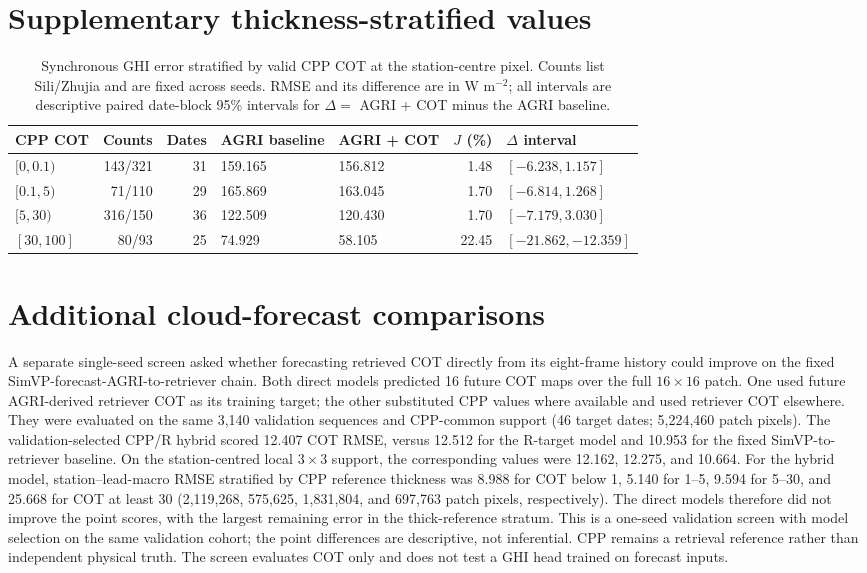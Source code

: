 \documentclass[11pt]{article}
\begin{document}
\FloatBarrier
\clearpage
\appendix
\section{Supplementary thickness-stratified values}
\renewcommand{\thetable}{S\arabic{table}}
\setcounter{table}{0}
\begin{table}[!ht]
\centering\small
\caption{Synchronous GHI error stratified by valid CPP COT at the station-centre pixel. Counts list Sili/Zhujia and are fixed across seeds. RMSE and its difference are in W m$^{-2}$; all intervals are descriptive paired date-block 95\% intervals for $\Delta=$ AGRI + COT minus the AGRI baseline.}
\label{tab:thickness}
\setlength{\tabcolsep}{4pt}
\begin{tabularx}{\linewidth}{lrrXXrl}
\toprule
CPP COT & Counts & Dates & AGRI baseline & AGRI + COT & $J$ (\%) & $\Delta$ interval\\
\midrule
$[0,0.1)$ & 143/321 & 31 & 159.165 & 156.812 & 1.48 & $[-6.238,1.157]$\\
$[0.1,5)$ & 71/110 & 29 & 165.869 & 163.045 & 1.70 & $[-6.814,1.268]$\\
$[5,30)$ & 316/150 & 36 & 122.509 & 120.430 & 1.70 & $[-7.179,3.030]$\\
$[30,100]$ & 80/93 & 25 & 74.929 & 58.105 & 22.45 & $[-21.862,-12.359]$\\
\bottomrule
\end{tabularx}
\end{table}
\FloatBarrier
\section{Additional cloud-forecast comparisons}\label{sec:forecast-supp}
A separate single-seed screen asked whether forecasting retrieved COT directly from its eight-frame history could improve on the fixed SimVP-forecast-AGRI-to-retriever chain. Both direct models predicted 16 future COT maps over the full $16\times16$ patch. One used future AGRI-derived retriever COT as its training target; the other substituted CPP values where available and used retriever COT elsewhere. They were evaluated on the same 3,140 validation sequences and CPP-common support (46 target dates; 5,224,460 patch pixels). The validation-selected CPP/R hybrid scored 12.407 COT RMSE, versus 12.512 for the R-target model and 10.953 for the fixed SimVP-to-retriever baseline. On the station-centred local $3\times3$ support, the corresponding values were 12.162, 12.275, and 10.664. For the hybrid model, station--lead-macro RMSE stratified by CPP reference thickness was 8.988 for COT below 1, 5.140 for 1--5, 9.594 for 5--30, and 25.668 for COT at least 30 (2,119,268, 575,625, 1,831,804, and 697,763 patch pixels, respectively). The direct models therefore did not improve the point scores, with the largest remaining error in the thick-reference stratum. This is a one-seed validation screen with model selection on the same validation cohort; the point differences are descriptive, not inferential. CPP remains a retrieval reference rather than independent physical truth. The screen evaluates COT only and does not test a GHI head trained on forecast inputs.
\end{document}
